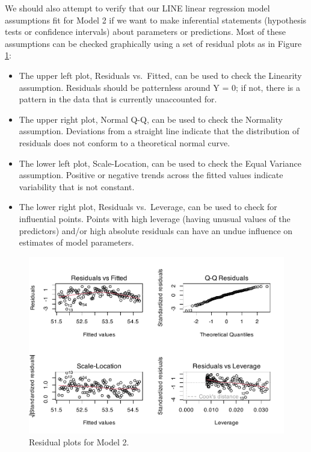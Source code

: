 \documentclass[
]{krantz}
\providecommand{\tightlist}{%
  \setlength{\itemsep}{0pt}\setlength{\parskip}{0pt}}
\begin{document}
We should also attempt to verify that our LINE linear regression model assumptions fit for Model 2 if we want to make inferential statements (hypothesis tests or confidence intervals) about parameters or predictions. Most of these assumptions can be checked graphically using a set of residual plots as in Figure \ref{fig:resid2}:

\begin{itemize}
\tightlist
\item
  The upper left plot, Residuals vs.~Fitted, can be used to check the Linearity assumption. Residuals should be patternless around Y = 0; if not, there is a pattern in the data that is currently unaccounted for.
\item
  The upper right plot, Normal Q-Q, can be used to check the Normality assumption. Deviations from a straight line indicate that the distribution of residuals does not conform to a theoretical normal curve.
\item
  The lower left plot, Scale-Location, can be used to check the Equal Variance assumption. Positive or negative trends across the fitted values indicate variability that is not constant.
\item
  The lower right plot, Residuals vs.~Leverage, can be used to check for influential points. Points with high leverage (having unusual values of the predictors) and/or high absolute residuals can have an undue influence on estimates of model parameters.
\end{itemize}

\begin{figure}

{\centering \includegraphics[width=0.9\linewidth]{bookdown-BeyondMLR_files/figure-latex/resid2-1} 

}

\caption{Residual plots for Model 2.}\label{fig:resid2}
\end{figure}
\end{document}
